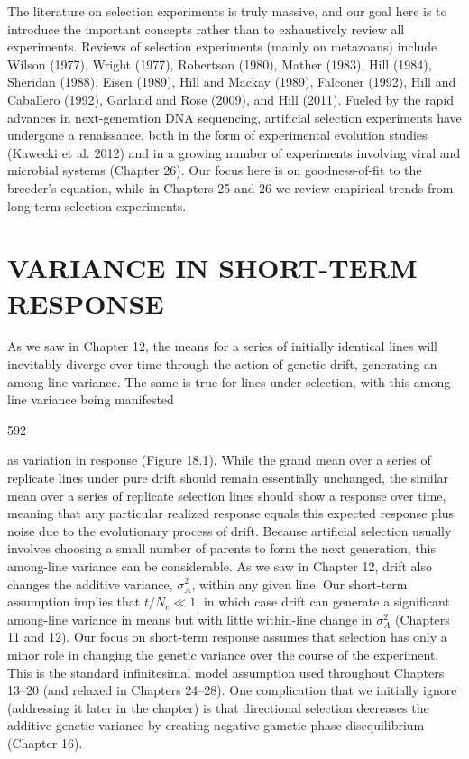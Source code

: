 \documentclass{article}
\begin{document}
The literature on selection experiments is truly massive, and our goal here is to introduce the important concepts rather than to exhaustively review all experiments. Reviews of selection experiments (mainly on metazoans) include Wilson (1977), Wright (1977), Robertson (1980), Mather (1983), Hill (1984), Sheridan (1988), Eisen (1989), Hill and Mackay (1989), Falconer (1992), Hill and Caballero (1992), Garland and Rose (2009), and Hill (2011). Fueled by the rapid advances in next-generation DNA sequencing, artificial selection experiments have undergone a renaissance, both in the form of experimental evolution studies (Kawecki et al. 2012) and in a growing number of experiments involving viral and microbial systems (Chapter 26). Our focus here is on goodness-of-fit to the breeder's equation, while in Chapters 25 and 26 we review empirical trends from long-term selection experiments.

\section{VARIANCE IN SHORT-TERM RESPONSE}
As we saw in Chapter 12, the means for a series of initially identical lines will inevitably diverge over time through the action of genetic drift, generating an among-line variance. The same is true for lines under selection, with this among-line variance being manifested

592

as variation in response (Figure 18.1). While the grand mean over a series of replicate lines under pure drift should remain essentially unchanged, the similar mean over a series of replicate selection lines should show a response over time, meaning that any particular realized response equals this expected response plus noise due to the evolutionary process of drift. Because artificial selection usually involves choosing a small number of parents to form the next generation, this among-line variance can be considerable. As we saw in Chapter 12, drift also changes the additive variance,  $ \sigma_A^2 $, within any given line. Our short-term assumption implies that  $ t/N_e \ll 1 $, in which case drift can generate a significant among-line variance in means but with little within-line change in  $ \sigma_A^2 $ (Chapters 11 and 12). Our focus on short-term response assumes that selection has only a minor role in changing the genetic variance over the course of the experiment. This is the standard infinitesimal model assumption used throughout Chapters 13–20 (and relaxed in Chapters 24–28). One complication that we initially ignore (addressing it later in the chapter) is that directional selection decreases the additive genetic variance by creating negative gametic-phase disequilibrium (Chapter 16).
\end{document}
